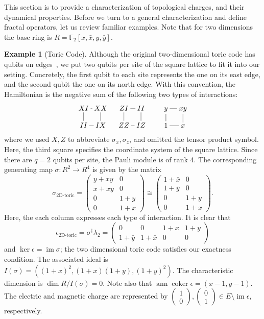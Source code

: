 \documentclass[letterpaper,12pt]{amsart}
\theoremstyle{definition} \newtheorem{defn}{Definition}
\theoremstyle{definition} \newtheorem{rem}{Remark}
\theoremstyle{definition} \newtheorem{example}{Example}
\newcommand{\im}{\mathop{\mathrm{im}}}
\newcommand{\coker}{\mathop{\mathrm{coker}}}
\newcommand{\ann}{\mathop{\mathrm{ann}}}
\newcommand{\FF}{\mathbb{F}}
\begin{document}
This section is to provide a characterization of topological charges,
and their dynamical properties.
Before we turn to a general characterization and define fractal operators,
let us review familiar examples.
Note that for two dimensions the base ring is $R = \FF_2[x,\bar x, y, \bar y]$.

\begin{example}[Toric Code]
\label{eg:2d-toric}
Although the original two-dimensional toric code has qubits on edges~\cite{Kitaev2003Fault-tolerant},
we put two qubits per site of the square lattice to fit it into our setting.
Concretely, the first qubit to each site represents the one on its east edge,
and the second qubit the one on its north edge. With this convention,
the Hamiltonian is the negative sum of the following two types of interactions:
\[
\xymatrix@!0{
XI \ar@{-}[r] & XX \ar@{-}[d] \\
II \ar@{-}[u] & IX \ar@{-}[l]
} \quad
\xymatrix@!0{
ZI \ar@{-}[r] & II \ar@{-}[d] \\
ZZ \ar@{-}[u] & IZ \ar@{-}[l]
} \quad \quad
\xymatrix@!0{
y \ar@{-}[r] & xy \ar@{-}[d] \\
1 \ar@{-}[u] & x \ar@{-}[l]
}
\]
where we used $X,Z$ to abbreviate $\sigma_x,\sigma_z$, and omitted the tensor product symbol.
Here, the third square specifies the coordinate system of the square lattice.
Since there are $q=2$ qubits per site, the Pauli module is of rank 4.
The corresponding generating map $\sigma : R^2 \to R^4$ is given by the matrix
\[
 \sigma_{\text{2D-toric}} = 
\begin{pmatrix}
 y+xy & 0 \\
 x+xy & 0 \\
\hline
 0    & 1 + y \\
 0    & 1 + x
\end{pmatrix}
\cong
\begin{pmatrix}
 1 + \bar x & 0 \\
 1 + \bar y & 0 \\
\hline
 0          & 1 + y \\
 0          & 1 + x
\end{pmatrix} .
\]
Here, the each column expresses each type of interaction.
It is clear that
\[
\epsilon_{\text{2D-toric}} = \sigma^\dagger \lambda_2 =
\begin{pmatrix}
 0         & 0         & 1 + x & 1 + y \\
 1+ \bar y & 1+ \bar x & 0     & 0
\end{pmatrix}
\]
and $\ker \epsilon = \im \sigma$;
the two dimensional toric code satisfies our exactness condition.
The associated ideal is $I(\sigma) = ( (1+x)^2, (1+x)(1+y), (1+y)^2 )$.
The characteristic dimension is $\dim R / I(\sigma) = 0$.
Note also that $\ann \coker \epsilon = (x-1,y-1)$.
The electric and magnetic charge are represented by
$\begin{pmatrix} 1 \\ 0 \end{pmatrix}, \begin{pmatrix} 0 \\ 1 \end{pmatrix} \in E \setminus \im \epsilon$,
respectively.



\end{example}
\end{document}
